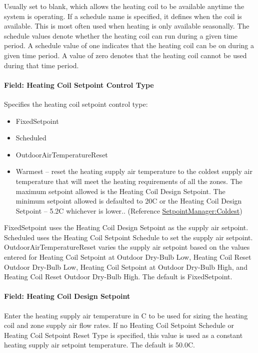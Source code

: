 Usually set to blank, which allows the heating coil to be available anytime the system is operating. If a schedule name is specified, it defines when the coil is available. This is most often used when heating is only available seasonally. The schedule values denote whether the heating coil can run during a given time period. A schedule value of one indicates that the heating coil can be on during a given time period. A value of zero denotes that the heating coil cannot be used during that time period.

\paragraph{Field: Heating Coil Setpoint Control Type}\label{field-heating-coil-setpoint-control-type-1}

Specifies the heating coil setpoint control type:

\begin{itemize}
\item
  FixedSetpoint
\item
  Scheduled
\item
  OutdoorAirTemperatureReset
\item
  Warmest -- reset the heating supply air temperature to the coldest supply air temperature that will meet the heating requirements of all the zones. The maximum setpoint allowed is the Heating Coil Design Setpoint. The minimum setpoint allowed is defaulted to 20C or the Heating Coil Design Setpoint -- 5.2C whichever is lower.. (Reference \hyperref[setpointmanagercoldest]{SetpointManager:Coldest})
\end{itemize}

FixedSetpoint uses the Heating Coil Design Setpoint as the supply air setpoint. Scheduled uses the Heating Coil Setpoint Schedule to set the supply air setpoint. OutdoorAirTemperatureReset varies the supply air setpoint based on the values entered for Heating Coil Setpoint at Outdoor Dry-Bulb Low, Heating Coil Reset Outdoor Dry-Bulb Low, Heating Coil Setpoint at Outdoor Dry-Bulb High, and Heating Coil Reset Outdoor Dry-Bulb High. The default is FixedSetpoint.

\paragraph{Field: Heating Coil Design Setpoint}\label{field-heating-coil-design-setpoint-4}

Enter the heating supply air temperature in C to be used for sizing the heating coil and zone supply air flow rates. If no Heating Coil Setpoint Schedule or Heating Coil Setpoint Reset Type is specified, this value is used as a constant heating supply air setpoint temperature. The default is 50.0C.


